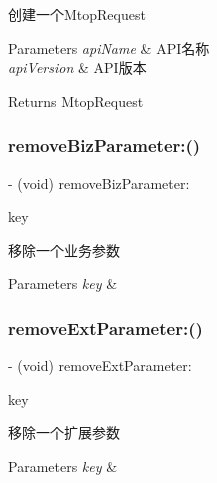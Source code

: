 创建一个\+Mtop\+Request 
\begin{DoxyParams}{Parameters}
{\em api\+Name} & A\+P\+I名称 \\
\hline
{\em api\+Version} & A\+P\+I版本 \\
\hline
\end{DoxyParams}
\begin{DoxyReturn}{Returns}
Mtop\+Request 
\end{DoxyReturn}
\mbox{\label{interface_t_b_s_d_k_request_affb181c3ffea7cfeba99e2b796daf49a}} 
\subsubsection{\texorpdfstring{remove\+Biz\+Parameter\+:()}{removeBizParameter:()}}
{\footnotesize\ttfamily -\/ (void) remove\+Biz\+Parameter\+: \begin{DoxyParamCaption}\item[{(N\+S\+String $\ast$)}]{key }\end{DoxyParamCaption}}

移除一个业务参数 
\begin{DoxyParams}{Parameters}
{\em key} & \\
\hline
\end{DoxyParams}
\mbox{\label{interface_t_b_s_d_k_request_a46188e6c3d2c18bd93b4fc899a642e09}} 
\subsubsection{\texorpdfstring{remove\+Ext\+Parameter\+:()}{removeExtParameter:()}}
{\footnotesize\ttfamily -\/ (void) remove\+Ext\+Parameter\+: \begin{DoxyParamCaption}\item[{(N\+S\+String $\ast$)}]{key }\end{DoxyParamCaption}}

移除一个扩展参数 
\begin{DoxyParams}{Parameters}
{\em key} & \\
\hline
\end{DoxyParams}
\mbox{\label{interface_t_b_s_d_k_request_aa8a1938d953fa9d55087184ef9154370}} 
